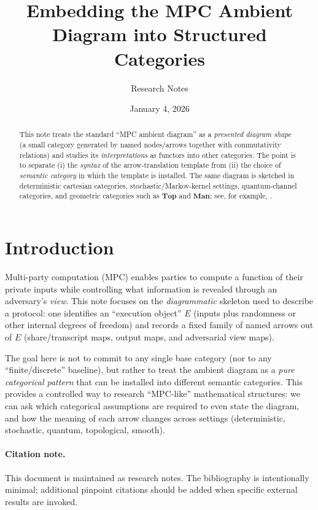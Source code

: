 \documentclass[11pt,a4paper]{article}
\title{Embedding the MPC Ambient Diagram into Structured Categories}
\author{Research Notes}
\date{January 4, 2026}
\theoremstyle{definition}
\theoremstyle{plain}
\begin{document}
\maketitle

\begin{abstract}
This note treats the standard ``MPC ambient diagram'' as a \emph{presented diagram shape} (a small category generated by named nodes/arrows together with commutativity relations) and studies its \emph{interpretations} as functors into other categories. The point is to separate (i) the \emph{syntax} of the arrow-translation template from (ii) the choice of \emph{semantic category} in which the template is installed. The same diagram is sketched in deterministic cartesian categories, stochastic/Markov-kernel settings, quantum-channel categories, and geometric categories such as $\mathbf{Top}$ and $\mathbf{Man}$; see, for example, \cite{MacLane1998, NielsenChuang2010}.
\end{abstract}

\tableofcontents

\section{Introduction}

Multi-party computation (MPC) enables parties to compute a function of their private inputs while controlling what information is revealed through an adversary's \emph{view}.
This note focuses on the \emph{diagrammatic} skeleton used to describe a protocol:
one identifies an ``execution object'' $E$ (inputs plus randomness or other internal degrees of freedom) and records a fixed family of named arrows out of $E$ (share/transcript maps, output maps, and adversarial view maps).

The goal here is not to commit to any single base category (nor to any ``finite/discrete'' baseline), but rather to treat the ambient diagram as a \emph{pure categorical pattern} that can be installed into different semantic categories.
This provides a controlled way to research ``MPC-like'' mathematical structures: we can ask which categorical assumptions are required to even state the diagram, and how the meaning of each arrow changes across settings (deterministic, stochastic, quantum, topological, smooth).

\paragraph{Citation note.}
This document is maintained as research notes. The bibliography is intentionally minimal; additional pinpoint citations should be added when specific external results are invoked.
\end{document}
